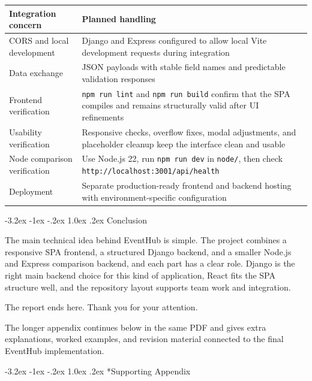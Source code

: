 \documentclass[11pt,a4paper]{article}
\makeatletter
\renewcommand\section{\@startsection{section}{1}{\z@}%
  {-3.2ex \@plus -1ex \@minus -.2ex}%
  {1.0ex \@plus .2ex}%
  {\normalfont\Large\sffamily\bfseries\color{ink}}}
\makeatother
\begin{document}
\begin{center}
\begin{tabularx}{\textwidth}{@{}lY@{}}
\toprule
\textbf{Integration concern} & \textbf{Planned handling} \\
\midrule
CORS and local development & Django and Express configured to allow local Vite development requests during integration \\
Data exchange & JSON payloads with stable field names and predictable validation responses \\
Frontend verification & \texttt{npm run lint} and \texttt{npm run build} confirm that the SPA compiles and remains structurally valid after UI refinements \\
Usability verification & Responsive checks, overflow fixes, modal adjustments, and placeholder cleanup keep the interface clean and usable \\
Node comparison verification & Use Node.js 22, run \texttt{npm run dev} in \texttt{node/}, then check \texttt{http://localhost:3001/api/health} \\
Deployment & Separate production-ready frontend and backend hosting with environment-specific configuration \\
\bottomrule
\end{tabularx}
\end{center}


\section{Conclusion}

The main technical idea behind EventHub is simple. The project combines a responsive SPA frontend, a structured Django backend, and a smaller Node.js and Express comparison backend, and each part has a clear role. Django is the right main backend choice for this kind of application, React fits the SPA structure well, and the repository layout supports team work and integration. 

The report ends here. Thank you for your attention.


The longer appendix continues below in the same PDF and gives extra explanations, worked examples, and revision material connected to the final EventHub implementation.

\clearpage
\setcounter{page}{1}
\renewcommand{\thepage}{A-\arabic{page}}
\section*{Supporting Appendix}
\end{document}
